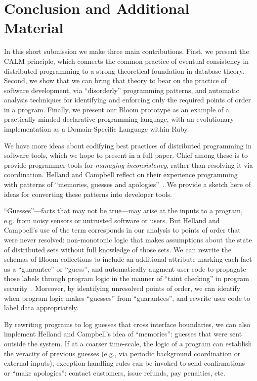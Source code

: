 \section{Conclusion and Additional Material}
\label{sec:conclusion}
In this short submission we make three main contributions.  First, we present the CALM principle, which connects the common practice of eventual consistency in distributed programming to a strong theoretical foundation in database theory.  Second, we show that we can bring that theory to bear on the practice of software development, via ``disorderly'' programming patterns, and automatic analysis techniques for  identifying and enforcing only the required points of order in a program. Finally, we present our Bloom prototype as an example of a practically-minded declarative programming language, with an evolutionary implementation as a Domain-Specific Language within Ruby.

We have more ideas about codifying best practices of distributed programming in software tools, which we hope to present in a full paper.  Chief among these is to provide programmer tools for \emph{managing inconsistency}, rather than resolving it via coordination.  Helland and Campbell reflect on their experience programming with patterns of ``memories, guesses and apologies''~\cite{quicksand}.  We provide a sketch here of ideas for converting these patterns into developer tools.

``Guesses''---facts that may not be true---may arise at the inputs to a program, e.g. from noisy sensors or untrusted software or users.  But Helland and Campbell's use of the term corresponds in our analysis to points of order that were never resolved: non-monotonic logic that makes assumptions about the state of distributed sets without full knowledge of those sets.  We can rewrite the schemas of Bloom collections to include an additional attribute marking each fact as a ``guarantee'' or ``guess'', and automatically augment user code to propagate those labels through program logic in the manner of ``taint checking'' in program security~\cite{taint,asbestos}.  Moreover, by identifying unresolved points of order, we can identify when program logic makes ``guesses'' from ``guarantees'', and rewrite user code to label data appropriately.

By rewriting programs to log guesses that cross interface boundaries, we can also implement Helland and Campbell's idea of ``memories'': guesses that were sent outside the system.  If at a coarser time-scale, the logic of a program can establish the veracity of previous guesses (e.g., via periodic background coordination or external inputs), exception-handling rules can be invoked to send confirmations or ``make apologies'': contact customers, issue refunds, pay penalties, etc.

